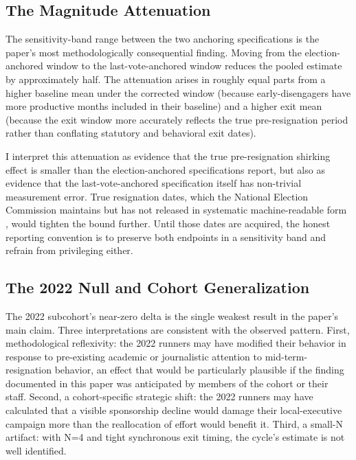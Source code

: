 \documentclass[11pt]{article}
\begin{document}
\subsection{The Magnitude Attenuation}

The sensitivity-band range between the two anchoring specifications is the paper's most methodologically consequential finding. Moving from the election-anchored window to the last-vote-anchored window reduces the pooled estimate by approximately half. The attenuation arises in roughly equal parts from a higher baseline mean under the corrected window (because early-disengagers have more productive months included in their baseline) and a higher exit mean (because the exit window more accurately reflects the true pre-resignation period rather than conflating statutory and behavioral exit dates).

I interpret this attenuation as evidence that the true pre-resignation shirking effect is smaller than the election-anchored specifications report, but also as evidence that the last-vote-anchored specification itself has non-trivial measurement error. True resignation dates, which the National Election Commission maintains but has not released in systematic machine-readable form \citep{hwang2025}, would tighten the bound further. Until those dates are acquired, the honest reporting convention is to preserve both endpoints in a sensitivity band and refrain from privileging either.

\subsection{The 2022 Null and Cohort Generalization}

The 2022 subcohort's near-zero delta is the single weakest result in the paper's main claim. Three interpretations are consistent with the observed pattern. First, methodological reflexivity: the 2022 runners may have modified their behavior in response to pre-existing academic or journalistic attention to mid-term-resignation behavior, an effect that would be particularly plausible if the finding documented in this paper was anticipated by members of the cohort or their staff. Second, a cohort-specific strategic shift: the 2022 runners may have calculated that a visible sponsorship decline would damage their local-executive campaign more than the reallocation of effort would benefit it. Third, a small-N artifact: with N=4 and tight synchronous exit timing, the cycle's estimate is not well identified.
\end{document}
